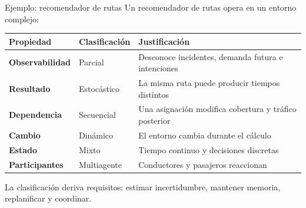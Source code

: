\documentclass[aspectratio=169,11pt]{beamer}
\begin{document}
\begin{frame}{Ejemplo: recomendador de rutas}
  Un recomendador de rutas opera en un entorno complejo:
  \small
  \begin{tabularx}{\textwidth}{>{\bfseries}p{} p{} X}
    \toprule
    Propiedad & Clasificación & Justificación \\
    \midrule
    Observabilidad & Parcial & Desconoce incidentes, demanda futura e intenciones \\
    Resultado & Estocástico & La misma ruta puede producir tiempos distintos \\
    Dependencia & Secuencial & Una asignación modifica cobertura y tráfico posterior \\
    Cambio & Dinámico & El entorno cambia durante el cálculo \\
    Estado & Mixto & Tiempo continuo y decisiones discretas \\
    Participantes & Multiagente & Conductores y pasajeros reaccionan \\
    \bottomrule
  \end{tabularx}
  \vfill
  \alert{La clasificación deriva requisitos: estimar incertidumbre, mantener memoria, replanificar y coordinar.}
\end{frame}
\end{document}
